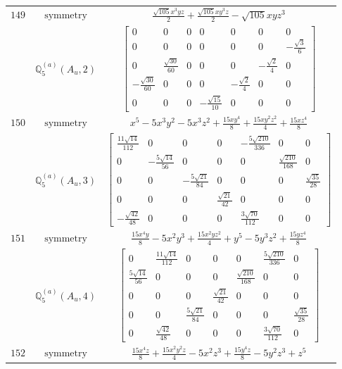 \documentclass[fleqn,8pt,landscape]{jsarticle}
\begin{document}
\begin{longtable}{ccc}
$ 149 $ & $ \text{symmetry} $ & $ \frac{\sqrt{105} x^{3} y z}{2} + \frac{\sqrt{105} x y^{3} z}{2} - \sqrt{105} x y z^{3} $ \\
$  $ & $ \mathbb{Q}_{5}^{(a)}(A_{u},2) $ & $ \begin{bmatrix} 0 & 0 & 0 & 0 & 0 & 0 & 0 \\ 0 & 0 & 0 & 0 & 0 & 0 & - \frac{\sqrt{3}}{6} \\ 0 & \frac{\sqrt{30}}{60} & 0 & 0 & 0 & - \frac{\sqrt{2}}{4} & 0 \\ - \frac{\sqrt{30}}{60} & 0 & 0 & 0 & - \frac{\sqrt{2}}{4} & 0 & 0 \\ 0 & 0 & 0 & - \frac{\sqrt{15}}{10} & 0 & 0 & 0 \end{bmatrix} $ \\ \hline
$ 150 $ & $ \text{symmetry} $ & $ x^{5} - 5 x^{3} y^{2} - 5 x^{3} z^{2} + \frac{15 x y^{4}}{8} + \frac{15 x y^{2} z^{2}}{4} + \frac{15 x z^{4}}{8} $ \\
$  $ & $ \mathbb{Q}_{5}^{(a)}(A_{u},3) $ & $ \begin{bmatrix} \frac{11 \sqrt{14}}{112} & 0 & 0 & 0 & - \frac{5 \sqrt{210}}{336} & 0 & 0 \\ 0 & - \frac{5 \sqrt{14}}{56} & 0 & 0 & 0 & \frac{\sqrt{210}}{168} & 0 \\ 0 & 0 & - \frac{5 \sqrt{21}}{84} & 0 & 0 & 0 & \frac{\sqrt{35}}{28} \\ 0 & 0 & 0 & \frac{\sqrt{21}}{42} & 0 & 0 & 0 \\ - \frac{\sqrt{42}}{48} & 0 & 0 & 0 & \frac{3 \sqrt{70}}{112} & 0 & 0 \end{bmatrix} $ \\ \hline
$ 151 $ & $ \text{symmetry} $ & $ \frac{15 x^{4} y}{8} - 5 x^{2} y^{3} + \frac{15 x^{2} y z^{2}}{4} + y^{5} - 5 y^{3} z^{2} + \frac{15 y z^{4}}{8} $ \\
$  $ & $ \mathbb{Q}_{5}^{(a)}(A_{u},4) $ & $ \begin{bmatrix} 0 & \frac{11 \sqrt{14}}{112} & 0 & 0 & 0 & \frac{5 \sqrt{210}}{336} & 0 \\ \frac{5 \sqrt{14}}{56} & 0 & 0 & 0 & \frac{\sqrt{210}}{168} & 0 & 0 \\ 0 & 0 & 0 & \frac{\sqrt{21}}{42} & 0 & 0 & 0 \\ 0 & 0 & \frac{5 \sqrt{21}}{84} & 0 & 0 & 0 & \frac{\sqrt{35}}{28} \\ 0 & \frac{\sqrt{42}}{48} & 0 & 0 & 0 & \frac{3 \sqrt{70}}{112} & 0 \end{bmatrix} $ \\ \hline
$ 152 $ & $ \text{symmetry} $ & $ \frac{15 x^{4} z}{8} + \frac{15 x^{2} y^{2} z}{4} - 5 x^{2} z^{3} + \frac{15 y^{4} z}{8} - 5 y^{2} z^{3} + z^{5} $ \\

\end{longtable}
\end{document}
